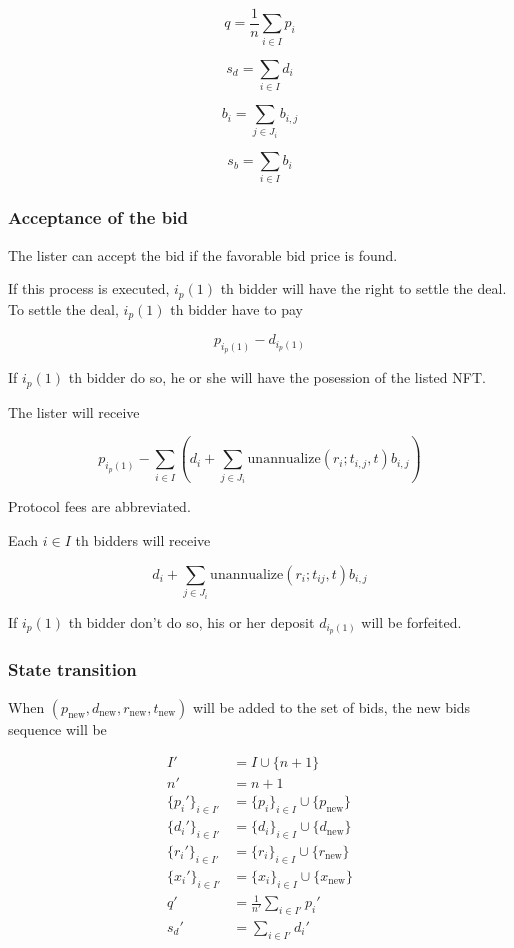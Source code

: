 \documentclass[dvipdfmx]{jsarticle}
\begin{document}
$$
  q = \frac{1}{n} \sum_{i \in I} p_i
$$

$$
  s_d = \sum_{i \in I} d_i
$$

$$
  b_i = \sum_{j \in J_i} b_{i,j}
$$

$$
  s_b = \sum_{i \in I} b_i
$$

\subsubsection{Acceptance of the bid}

The lister can accept the bid if the favorable bid price is found.

If this process is executed, $i_p(1)$ th bidder will have the right to settle the deal.
To settle the deal, $i_p(1)$ th bidder have to pay

$$
  p_{i_p(1)} - d_{i_p(1)}
$$

If $i_p(1)$ th bidder do so, he or she will have the posession of the listed NFT.

The lister will receive

$$
  p_{i_p(1)} - \sum_{i \in I} \left( d_i + \sum_{j \in J_i} \text{unannualize}(r_i; t_{i,j}, t) b_{i,j} \right)
$$

Protocol fees are abbreviated.

Each $i \in I$ th bidders will receive

$$
  d_i + \sum_{j \in J_i} \text{unannualize}(r_i; t_{ij}, t) b_{i,j}
$$

If $i_p(1)$ th bidder don't do so, his or her deposit $d_{i_p(1)}$ will be forfeited.

\subsubsection{State transition}

When $(p_{\text{new}}, d_{\text{new}}, r_{\text{new}}, t_{\text{new}})$ will be added to the set of bids, the new bids sequence will be

$$
\begin{aligned}
  I' &= I \cup \{n+1\} \\
  n' &= n + 1 \\
  \{p_i'\}_{i \in I'} &= \{p_i\}_{i \in I} \cup \{p_{\text{new}}\} \\
  \{d_i'\}_{i \in I'} &= \{d_i\}_{i \in I} \cup \{d_{\text{new}}\} \\
  \{r_i'\}_{i \in I'} &= \{r_i\}_{i \in I} \cup \{r_{\text{new}}\} \\
  \{x_i'\}_{i \in I'} &= \{x_i\}_{i \in I} \cup \{x_{\text{new}}\} \\
  q' &= \frac{1}{n'} \sum_{i \in I'} p_i' \\
  s_d' &= \sum_{i \in I'} d_i'
\end{aligned}
$$
\end{document}
